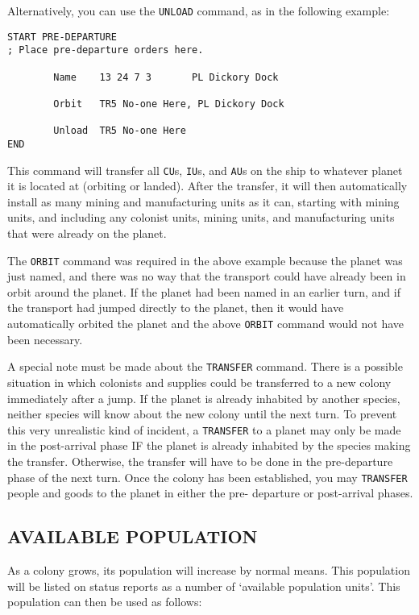 \documentclass[10pt,titlepage]{article}
\begin{document}
Alternatively, you can use the \texttt{UNLOAD} command, as in the following example:

\begin{verbatim}
START PRE-DEPARTURE
; Place pre-departure orders here.

        Name    13 24 7 3       PL Dickory Dock

        Orbit   TR5 No-one Here, PL Dickory Dock

        Unload  TR5 No-one Here
END\end{verbatim} 

This command will transfer all \texttt{CU}s, \texttt{IU}s, and \texttt{AU}s on the ship to whatever planet
it is located at (orbiting or landed).  After the transfer, it will then
automatically install as many mining and manufacturing units as it can,
starting with mining units, and including any colonist units, mining units,
and manufacturing units that were already on the planet.

The \texttt{ORBIT} command was required in the above example because the planet was just
named, and there was no way that the transport could have already been in orbit
around the planet.  If the planet had been named in an earlier turn, and if the
transport had jumped directly to the planet, then it would have automatically
orbited the planet and the above \texttt{ORBIT} command would not have been necessary.

A special note must be made about the \texttt{TRANSFER} command.  There is a possible
situation in which colonists and supplies could be transferred to a new colony
immediately after a jump.  If the planet is already inhabited by another
species, neither species will know about the new colony until the next turn.
To prevent this very unrealistic kind of incident, a \texttt{TRANSFER} to a planet may
only be made in the post-arrival phase IF the planet is already inhabited by
the species making the transfer.  Otherwise, the transfer will have to be
done in the pre-departure phase of the next turn.  Once the colony has been
established, you may \texttt{TRANSFER} people and goods to the planet in either the pre-
departure or post-arrival phases.


\subsection{AVAILABLE POPULATION}
\label{sec:availablepop}


As a colony grows, its population will increase by normal means.  This
population will be listed on status reports as a number of `available
population units'.  This population can then be used as follows:
\end{document}

